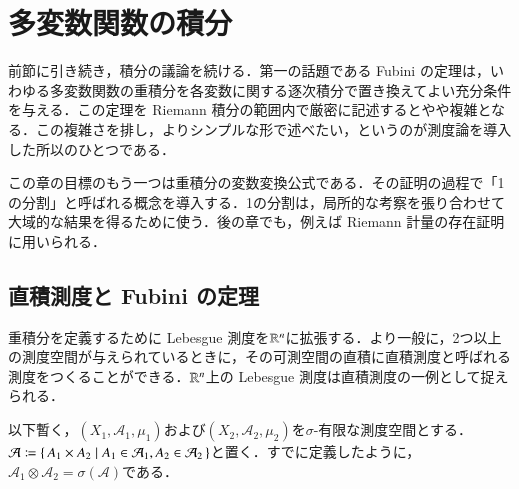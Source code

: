 \section{多変数関数の積分}

前節に引き続き，積分の議論を続ける．第一の話題である Fubini の定理は，いわゆる多変数関数の重積分を各変数に関する逐次積分で置き換えてよい充分条件を与える．この定理を Riemann 積分の範囲内で厳密に記述するとやや複雑となる．この複雑さを排し，よりシンプルな形で述べたい，というのが測度論を導入した所以のひとつである．

この章の目標のもう一つは重積分の変数変換公式である．その証明の過程で「1の分割」と呼ばれる概念を導入する．1の分割は，局所的な考察を張り合わせて大域的な結果を得るために使う．後の章でも，例えば Riemann 計量の存在証明に用いられる．

\subsection{直積測度と Fubini の定理}

重積分を定義するために Lebesgue 測度を$\mathbb{R}^n$に拡張する．より一般に，2つ以上の測度空間が与えられているときに，その可測空間の直積に直積測度と呼ばれる測度をつくることができる．$\mathbb{R}^n$上の Lebesgue 測度は直積測度の一例として捉えられる．

以下暫く，$(X_1, \mathcal{A}_1, \mu_1)$および$(X_2, \mathcal{A}_2, \mu_2)$を$\sigma$-有限な測度空間とする．$\mathcal{A} \coloneqq \set{A_1 \times A_2 | A_1 \in \mathcal{A}_1, A_2 \in \mathcal{A}_2}$と置く．すでに定義したように，$\mathcal{A}_1 \otimes \mathcal{A}_2 = \sigma(\mathcal{A})$である．

